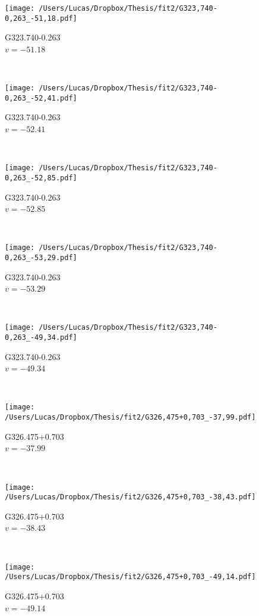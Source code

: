 \begin{figure*}[t]\ContinuedFloat
	\centering
	\begin{subfigure}[t]{0.3\textwidth}
		\texttt{[image: /Users/Lucas/Dropbox/Thesis/fit2/G323,740-0,263\_-51,18.pdf]}
		\caption[]{G323.740-0.263\\$v=-51.18$\,\kms}
	\end{subfigure}
	~
	\begin{subfigure}[t]{0.3\textwidth}
		\texttt{[image: /Users/Lucas/Dropbox/Thesis/fit2/G323,740-0,263\_-52,41.pdf]}
		\caption[]{G323.740-0.263\\$v=-52.41$\,\kms}
	\end{subfigure}
	~
	\begin{subfigure}[t]{0.3\textwidth}
		\texttt{[image: /Users/Lucas/Dropbox/Thesis/fit2/G323,740-0,263\_-52,85.pdf]}
		\caption[]{G323.740-0.263\\$v=-52.85$\,\kms}
	\end{subfigure}
	~
	\begin{subfigure}[t]{0.3\textwidth}
		\texttt{[image: /Users/Lucas/Dropbox/Thesis/fit2/G323,740-0,263\_-53,29.pdf]}
		\caption[]{G323.740-0.263\\$v=-53.29$\,\kms}
	\end{subfigure}
	~
	\begin{subfigure}[t]{0.3\textwidth}
		\texttt{[image: /Users/Lucas/Dropbox/Thesis/fit2/G323,740-0,263\_-49,34.pdf]}
		\caption[]{G323.740-0.263\\$v=-49.34$\,\kms}
	\end{subfigure}
	~
	\begin{subfigure}[t]{0.3\textwidth}
		\texttt{[image: /Users/Lucas/Dropbox/Thesis/fit2/G326,475+0,703\_-37,99.pdf]}
		\caption[]{G326.475+0.703\\$v=-37.99$\,\kms}
	\end{subfigure}
	~
	\begin{subfigure}[t]{0.3\textwidth}
		\texttt{[image: /Users/Lucas/Dropbox/Thesis/fit2/G326,475+0,703\_-38,43.pdf]}
		\caption[]{G326.475+0.703\\$v=-38.43$\,\kms}
	\end{subfigure}
	~
	\begin{subfigure}[t]{0.3\textwidth}
		\texttt{[image: /Users/Lucas/Dropbox/Thesis/fit2/G326,475+0,703\_-49,14.pdf]}
		\caption[]{G326.475+0.703\\$v=-49.14$\,\kms}

\end{subfigure}
\end{figure*}

